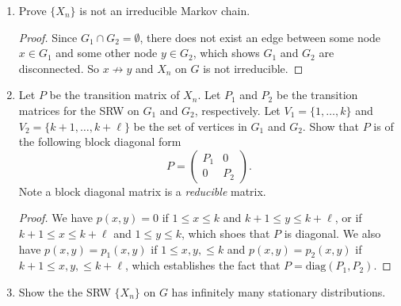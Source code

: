\documentclass[oneside,reqno]{amsart}
\theoremstyle{definition}
\begin{document}
\begin{enumerate}
\item
Prove $\{X_n\}$ is not an irreducible Markov chain. 

\begin{proof}
Since $G_1 \cap G_2 = \emptyset$, there does not exist an edge between some node $x \in G_1$ and some other node $y \in G_2$, which shows $G_1$ and $G_2$ are disconnected. So $x \not\to y$ and $X_n$ on $G$ is not irreducible. 
\end{proof}

\item
Let $P$ be the transition matrix of $X_n$. Let $P_1$ and $P_2$ be the transition matrices for the SRW on $G_1$ and $G_2$, respectively. Let $V_1 =\{1,\dotsc,k\}$ and $V_2 =\{k+1,\dotsc,k+\ell\}$ be the set of vertices in $G_1$ and $G_2$. Show that $P$ is of the following block diagonal form 
\begin{equation}\label{eq:block-diag}
	P = \begin{pmatrix}
		P_1 & 0 \\
		0 & P_2 
	\end{pmatrix}.
\end{equation}
Note a block diagonal matrix is a \emph{reducible} matrix.

\begin{proof}
We have $p(x,y) = 0$ if $1 \leq x \leq k$ and $k+1 \leq y\leq k + \ell$, or if $k +1 \leq x \leq k + \ell$ and $1 \leq y \leq k$, which shoes that $P$ is diagonal. We also have $p(x,y) = p_1(x,y)$ if $1 \leq x,y, \leq k$ and $p(x,y) = p_2(x,y)$ if $k+1 \leq x,y, \leq k+\ell$, which establishes the fact that $P = \textrm{diag}(P_1, P_2)$.
\end{proof}


\item
Show the the SRW $\{X_n\}$ on $G$ has infinitely many stationary distributions. 


\end{enumerate}
\end{document}
